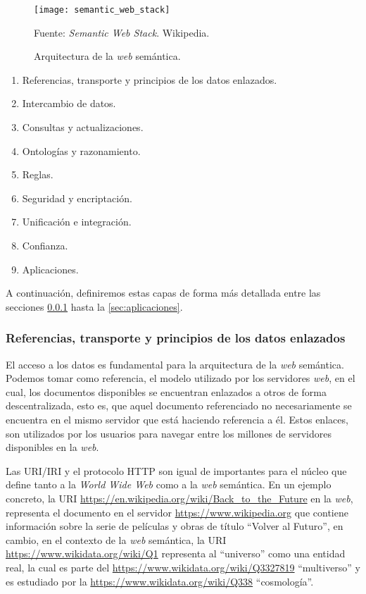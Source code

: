 \begin{figure}
    \centering
    \texttt{[image: semantic\_web\_stack]}
    \caption{Arquitectura de la \textit{web} semántica.} Fuente:
    \textit{Semantic Web Stack}. Wikipedia.
    \label{fig:semantic-web-arq}
\end{figure}

\begin{enumerate}
    \item Referencias, transporte y principios de los datos enlazados.
    \item Intercambio de datos.
    \item Consultas y actualizaciones.
    \item Ontologías y razonamiento.
    \item Reglas.
    \item Seguridad y encriptación.
    \item Unificación e integración.
    \item Confianza.
    \item Aplicaciones.
\end{enumerate}

A continuación, definiremos estas capas de forma más detallada entre las secciones
\ref{sec:refs-transporte-enlazados} hasta la \ref{sec:aplicaciones}.

\subsubsection{Referencias, transporte y principios de los datos enlazados}
\label{sec:refs-transporte-enlazados}

El acceso a los datos es fundamental para la arquitectura de la \textit{web} semántica. Podemos tomar como referencia, el modelo utilizado por los servidores \textit{web}, en el cual, los documentos disponibles se encuentran enlazados a otros de forma descentralizada, esto es, que aquel documento referenciado no necesariamente se encuentra en el mismo servidor que está haciendo referencia a él. Estos enlaces, son utilizados por los usuarios para navegar entre los millones de servidores disponibles en la \textit{web}.

Las URI/IRI y el protocolo HTTP son igual de importantes para el núcleo que define tanto a la \textit{World Wide Web} como a la \textit{web} semántica. En un ejemplo concreto, la URI \url{https://en.wikipedia.org/wiki/Back_to_the_Future} en la \textit{web}, representa el documento en el servidor \url{https://www.wikipedia.org} que contiene información sobre la serie de películas y obras de título ``Volver al Futuro'', en cambio, en el contexto de la \textit{web} semántica, la URI \url{https://www.wikidata.org/wiki/Q1} representa al ``universo'' como una entidad real, la cual es parte del \url{https://www.wikidata.org/wiki/Q3327819} ``multiverso'' y es estudiado por la \url{https://www.wikidata.org/wiki/Q338} ``cosmología''.

